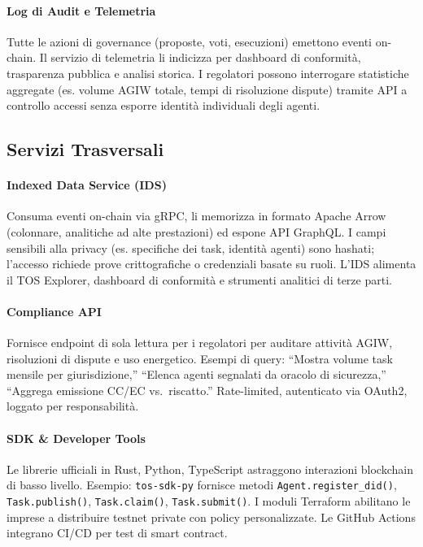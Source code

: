 \documentclass[11pt]{article}
\begin{document}
\paragraph{Log di Audit e Telemetria} Tutte le azioni di governance (proposte, voti, esecuzioni) emettono eventi on-chain. Il servizio di telemetria li indicizza per dashboard di conformità, trasparenza pubblica e analisi storica. I regolatori possono interrogare statistiche aggregate (es. volume AGIW totale, tempi di risoluzione dispute) tramite API a controllo accessi senza esporre identità individuali degli agenti.

\subsection{Servizi Trasversali}
\paragraph{Indexed Data Service (IDS)} Consuma eventi on-chain via gRPC, li memorizza in formato Apache Arrow (colonnare, analitiche ad alte prestazioni) ed espone API GraphQL. I campi sensibili alla privacy (es. specifiche dei task, identità agenti) sono hashati; l'accesso richiede prove crittografiche o credenziali basate su ruoli. L'IDS alimenta il TOS Explorer, dashboard di conformità e strumenti analitici di terze parti.

\paragraph{Compliance API} Fornisce endpoint di sola lettura per i regolatori per auditare attività AGIW, risoluzioni di dispute e uso energetico. Esempi di query: ``Mostra volume task mensile per giurisdizione,'' ``Elenca agenti segnalati da oracolo di sicurezza,'' ``Aggrega emissione CC/EC vs.\ riscatto.'' Rate-limited, autenticato via OAuth2, loggato per responsabilità.

\paragraph{SDK \& Developer Tools} Le librerie ufficiali in Rust, Python, TypeScript astraggono interazioni blockchain di basso livello. Esempio: \texttt{tos-sdk-py} fornisce metodi \texttt{Agent.register\_did()}, \texttt{Task.publish()}, \texttt{Task.claim()}, \texttt{Task.submit()}. I moduli Terraform abilitano le imprese a distribuire testnet private con policy personalizzate. Le GitHub Actions integrano CI/CD per test di smart contract.
\end{document}
